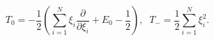 \begin{equation}
	T_{0}=-\frac{1}{2}
	\left(
	\sum_{i=1}^{N} \xi_{i} \frac {\partial}
	{\partial \xi_{i}}+E_{0}-\frac{1}{2}
	\right),\;\;
	 T_{-}=\frac{1}{2}\sum_{i=1}^{N} \xi_{i}^{2}.
\end{equation}


